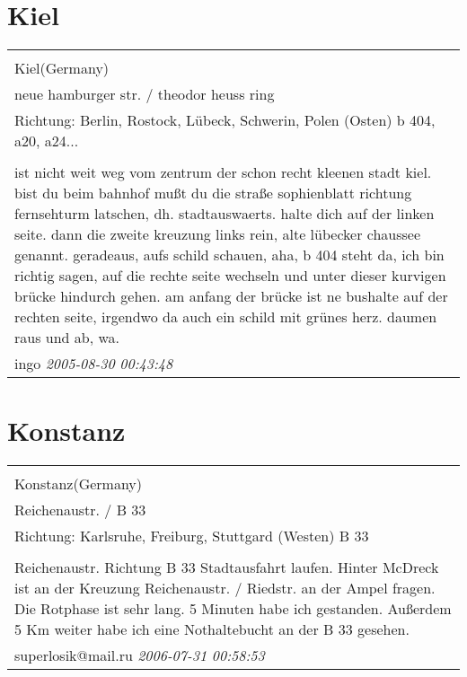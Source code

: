 \documentclass[a4paper,12pt]{article}
\begin{document}
\section{Kiel}
\begin{tabular}{|p{13cm}|}
\hline\\
Kiel(Germany)\\
neue hamburger str. / theodor heuss ring\\
Richtung: Berlin, Rostock, Lübeck, Schwerin, Polen (Osten) b 404, a20, a24... \\
\hline\\
ist nicht weit weg vom zentrum der schon recht kleenen stadt kiel.
bist du beim bahnhof mußt du die straße sophienblatt richtung fernsehturm latschen, dh. stadtauswaerts. halte dich auf der linken seite. dann die zweite kreuzung links rein, alte lübecker chaussee genannt. geradeaus, aufs schild schauen, aha, b 404 steht da, ich bin richtig sagen, auf die rechte seite wechseln und unter dieser kurvigen brücke hindurch gehen. am anfang der brücke ist ne bushalte auf der rechten seite, irgendwo da auch ein schild mit grünes herz. daumen raus und ab, wa. \\
ingo \textit{ 2005-08-30 00:43:48 }\\\hline
\end{tabular}


\section{Konstanz}
\begin{tabular}{|p{13cm}|}
\hline\\
Konstanz(Germany)\\
Reichenaustr. / B 33\\
Richtung: Karlsruhe, Freiburg, Stuttgard (Westen) B 33 \\
\hline\\
Reichenaustr. Richtung B 33 Stadtausfahrt laufen. Hinter McDreck ist an der Kreuzung Reichenaustr. / Riedstr. an der Ampel fragen. Die Rotphase ist sehr lang. 5 Minuten habe ich gestanden. Außerdem 5 Km weiter habe ich eine Nothaltebucht an der B 33 gesehen. \\
superlosik@mail.ru \textit{ 2006-07-31 00:58:53 }\\\hline
\end{tabular}
\end{document}

